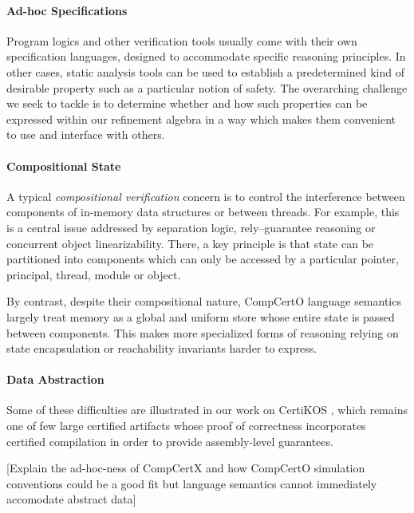 \paragraph{Ad-hoc Specifications} %

Program logics and other verification tools
usually come with their own specification languages,
designed to accommodate specific reasoning principles.
In other cases,
static analysis tools
can be used to establish a predetermined kind of desirable property
such as a particular notion of safety.
%
The overarching challenge we seek to tackle
is to determine whether and how such properties
can be expressed within our refinement algebra
in a way which makes them convenient to use and interface
with others.


\paragraph{Compositional State} %

A typical \emph{compositional verification} concern is to
control the interference between
components of in-memory data structures
or between threads.
For example,
this is a central issue addressed by
separation logic,
rely--guarantee reasoning or
concurrent object linearizability.
There,
a key principle is that
state can be partitioned into components
which can only be accessed by a particular
pointer, principal, thread, module or object.

By contrast,
despite their compositional nature,
CompCertO language semantics
largely treat memory as a global and uniform store
whose entire state is passed between components.
This makes more specialized forms of reasoning
relying on state encapsulation or reachability invariants
harder to express.


\paragraph{Data Abstraction} %

Some of these difficulties are illustrated
in our work on CertiKOS \cite{dscal15},
which remains one of few large certified artifacts
whose proof of correctness incorporates certified compilation
in order to provide assembly-level guarantees.

[Explain the ad-hoc-ness of CompCertX and how
CompCertO simulation conventions could be a good fit but
language semantics cannot immediately accomodate abstract data]

